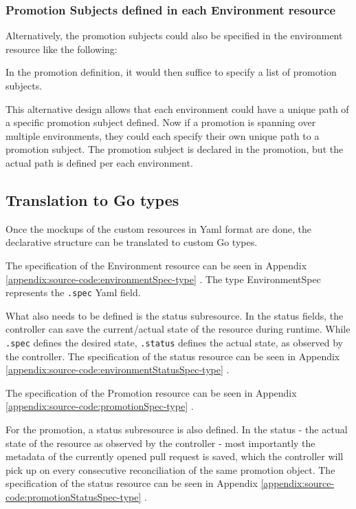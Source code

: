 \subsubsection*{Promotion Subjects defined in each Environment resource}

Alternatively, the promotion subjects could also be specified
in the environment resource like the following:



In the promotion definition,
it would then suffice to specify
a list of promotion subjects.



This alternative design allows that each environment could have
a unique path of a specific promotion subject defined.
Now if a promotion is spanning over multiple environments,
they could each specify their own unique path to a promotion subject.
The promotion subject is declared in the promotion,
but the actual path is defined per each environment.

\subsection{Translation to Go types}

Once the mockups of the custom resources in Yaml format are done,
the declarative structure can be translated to custom Go types.

The specification of the Environment resource can be seen in Appendix
\ref{appendix:source-code:environmentSpec-type} .
The type EnvironmentSpec represents the \lstinline|.spec| Yaml field.

What also needs to be defined is the status subresource.
In the status fields, the controller can save the current/actual state
of the resource during runtime.
While \lstinline|.spec| defines the desired state,
\lstinline|.status| defines the actual state, as observed by the controller.
The specification of the status resource can be seen in Appendix
\ref{appendix:source-code:environmentStatusSpec-type} .

The specification of the Promotion resource can be seen in Appendix
\ref{appendix:source-code:promotionSpec-type} .

For the promotion,
a status subresource is also defined.
In the status - the actual state of the resource as observed by the controller -
most importantly the metadata of the currently opened pull request is saved,
which the controller will pick up on every consecutive reconciliation
of the same promotion object.
The specification of the status resource can be seen in Appendix
\ref{appendix:source-code:promotionStatusSpec-type} .

